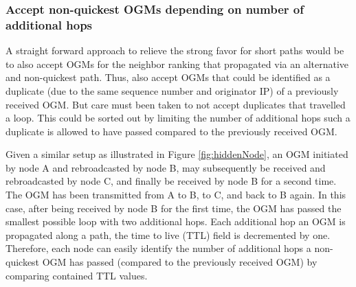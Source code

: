 \documentclass[11pt]{article}
\begin{document}
\subsubsection{Accept non-quickest OGMs depending on number of additional hops}





A straight forward approach to relieve the strong favor for short paths would be to also accept OGMs for the neighbor ranking that propagated via an alternative and non-quickest path. 
%
Thus, also accept OGMs that could be identified as a duplicate (due to the same sequence number and originator IP) of a previously received OGM.
%
But care must been taken to not accept duplicates that travelled a loop.  
%
This could be sorted out by limiting the number of additional hops such a duplicate is allowed to have passed compared to the previously received OGM.
%

Given a similar setup as illustrated in Figure \ref{fig:hiddenNode}, an OGM initiated by node A and rebroadcasted by node B, may subsequently be received and rebroadcasted by node C, and finally be received by node B for a second time. 
%
The OGM has been transmitted from A to B, to C, and back to B again. 
%
In this case, after being received by node B for the first time, the OGM has passed the smallest possible loop with two additional hops.
%
Each additional hop an OGM is propagated along a path, the time to live (TTL) field is decremented by one. 
%
Therefore, each node can easily identify the number of additional hops a non-quickest OGM has passed (compared to the previously received OGM) by comparing contained TTL values.
\end{document}
